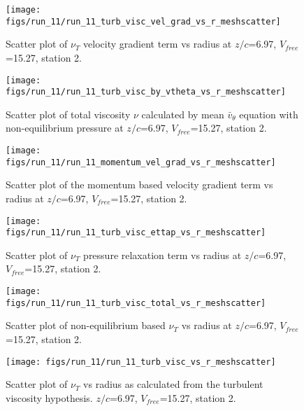 \begin{figure}[H]
\centering
\texttt{[image: figs/run\_11/run\_11\_turb\_visc\_vel\_grad\_vs\_r\_meshscatter]}
\caption{Scatter plot of $\nu_T$ velocity gradient term vs radius at $z/c$=6.97, $V_{free}$=15.27, station 2.}
\end{figure}


\begin{figure}[H]
\centering
\texttt{[image: figs/run\_11/run\_11\_turb\_visc\_by\_vtheta\_vs\_r\_meshscatter]}
\caption{Scatter plot of total viscosity $\nu$ calculated by mean $\bar{v}_{\theta}$ equation with non-equilibrium pressure at $z/c$=6.97, $V_{free}$=15.27, station 2.}
\end{figure}


\begin{figure}[H]
\centering
\texttt{[image: figs/run\_11/run\_11\_momentum\_vel\_grad\_vs\_r\_meshscatter]}
\caption{Scatter plot of the momentum based velocity gradient term vs radius at $z/c$=6.97, $V_{free}$=15.27, station 2.}
\end{figure}


\begin{figure}[H]
\centering
\texttt{[image: figs/run\_11/run\_11\_turb\_visc\_ettap\_vs\_r\_meshscatter]}
\caption{Scatter plot of $\nu_T$ pressure relaxation term vs radius at $z/c$=6.97, $V_{free}$=15.27, station 2.}
\end{figure}


\begin{figure}[H]
\centering
\texttt{[image: figs/run\_11/run\_11\_turb\_visc\_total\_vs\_r\_meshscatter]}
\caption{Scatter plot of non-equilibrium based $\nu_T$ vs radius at $z/c$=6.97, $V_{free}$=15.27, station 2.}
\end{figure}


\begin{figure}[H]
\centering
\texttt{[image: figs/run\_11/run\_11\_turb\_visc\_vs\_r\_meshscatter]}
\caption{Scatter plot of $\nu_T$ vs radius as calculated from the turbulent viscosity hypothesis. $z/c$=6.97, $V_{free}$=15.27, station 2.}
\end{figure}


